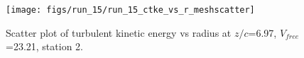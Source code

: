 \begin{figure}[H]
\centering
\texttt{[image: figs/run\_15/run\_15\_ctke\_vs\_r\_meshscatter]}
\caption{Scatter plot of turbulent kinetic energy vs radius at $z/c$=6.97, $V_{free}$=23.21, station 2.}
\label{fig:run_15_ctke_vs_r_meshscatter}
\end{figure}


